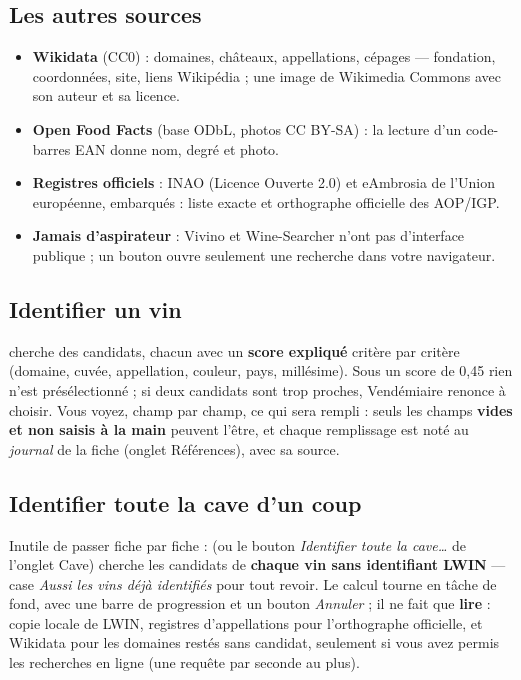 \documentclass[11pt,a4paper]{article}
\begin{document}
\subsection{Les autres sources}
\begin{itemize}
  \item \textbf{Wikidata} (CC0) : domaines, châteaux, appellations, cépages — fondation, coordonnées, site,
        liens Wikipédia ; une image de Wikimedia Commons avec son auteur et sa licence.
  \item \textbf{Open Food Facts} (base ODbL, photos CC BY-SA) : la lecture d'un code-barres EAN donne nom,
        degré et photo.
  \item \textbf{Registres officiels} : INAO (Licence Ouverte 2.0) et eAmbrosia de l'Union européenne,
        embarqués : liste exacte et orthographe officielle des AOP/IGP.
  \item \textbf{Jamais d'aspirateur} : Vivino et Wine-Searcher n'ont pas d'interface publique ; un bouton
        ouvre seulement une recherche dans votre navigateur.
\end{itemize}

\subsection{Identifier un vin}
 cherche des candidats, chacun avec un \textbf{score
expliqué} critère par critère (domaine, cuvée, appellation, couleur, pays, millésime). Sous un score de
0,45 rien n'est présélectionné ; si deux candidats sont trop proches, Vendémiaire renonce à choisir. Vous
voyez, champ par champ, ce qui sera rempli : seuls les champs \textbf{vides et non saisis à la main}
peuvent l'être, et chaque remplissage est noté au \emph{journal} de la fiche (onglet Références), avec sa
source.


\subsection{Identifier toute la cave d'un coup}
Inutile de passer fiche par fiche :  (ou le bouton
\emph{Identifier toute la cave…} de l'onglet Cave) cherche les candidats de \textbf{chaque vin sans
identifiant LWIN} --- case \emph{Aussi les vins déjà identifiés} pour tout revoir. Le calcul tourne en
tâche de fond, avec une barre de progression et un bouton \emph{Annuler} ; il ne fait que \textbf{lire} :
copie locale de LWIN, registres d'appellations pour l'orthographe officielle, et Wikidata pour les
domaines restés sans candidat, seulement si vous avez permis les recherches en ligne (une requête par
seconde au plus).
\end{document}
